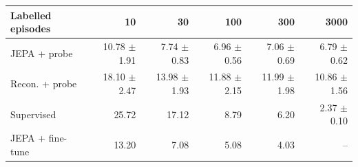 \begin{tabular}{lrrrrr}
\toprule
Labelled episodes & 10 & 30 & 100 & 300 & 3000\\
\midrule
JEPA + probe & 10.78 $\pm$ 1.91 & 7.74 $\pm$ 0.83 & 6.96 $\pm$ 0.56 & 7.06 $\pm$ 0.69 & 6.79 $\pm$ 0.62\\
Recon. + probe & 18.10 $\pm$ 2.47 & 13.98 $\pm$ 1.93 & 11.88 $\pm$ 2.15 & 11.99 $\pm$ 1.98 & 10.86 $\pm$ 1.56\\
Supervised & 25.72 & 17.12 & 8.79 & 6.20 & 2.37 $\pm$ 0.10\\
JEPA + fine-tune & 13.20 & 7.08 & 5.08 & 4.03 & --\\
\bottomrule
\end{tabular}